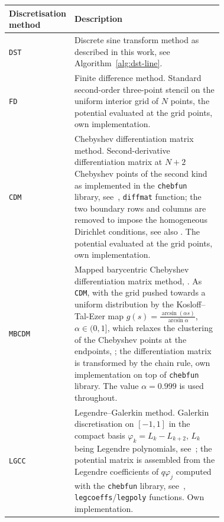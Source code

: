 %
%

\begin{table}
  \centering
  \begin{tabular}{l p{0.72\linewidth}}
    \toprule
    Discretisation method & Description \\
    \midrule
    \texttt{DST} & Discrete sine transform method as described in this work, see Algorithm~\ref{alg:dst-line}. \\
    \texttt{FD} & Finite difference method. Standard second-order three-point stencil on the uniform interior grid of $N$ points, the potential evaluated at the grid points, own implementation. \\
    \texttt{CDM} & Chebyshev differentiation matrix method. Second-derivative differentiation matrix at \hbox{$N+2$} Chebyshev points of the second kind as implemented in the \texttt{chebfun} library, see~\cite{driscoll.ta.hale.n.ea:chebfun}, \lstinline{diffmat} function; the two boundary rows and columns are removed to impose the homogeneous Dirichlet conditions, see also \cite{trefethen.ln:spectral}. The potential evaluated at the grid points, own implementation. \\
    \texttt{MBCDM} & Mapped barycentric Chebyshev differentiation matrix method, \cite{zhang.x:mapped}. As \texttt{CDM}, with the grid pushed towards a uniform distribution by the Kosloff--Tal-Ezer map $g(s) = \frac{\arcsin(\alpha s)}{\arcsin \alpha}$, $\alpha \in (0, 1]$, which relaxes the clustering of the Chebyshev points at the endpoints, \cite{kosloff.d.tal-ezer.h:modified}; the differentiation matrix is transformed by the chain rule, own implementation on top of \texttt{chebfun} library. The value $\alpha = 0.999$ is used throughout. \\
    \texttt{LGCC} & Legendre--Galerkin method. Galerkin discretisation on $[-1, 1]$ in the compact basis $\varphi_k = L_k - L_{k+2}$, $L_k$ being Legendre polynomials, see~\cite{shen.j.tang.t.ea:spectral}; the potential matrix is assembled from the Legendre coefficients of $q \varphi_j$ computed with the \texttt{chebfun} library, see~\cite{driscoll.ta.hale.n.ea:chebfun}, \lstinline{legcoeffs}/\lstinline{legpoly} functions. Own implementation. \\ %

\end{tabular}
\end{table}
